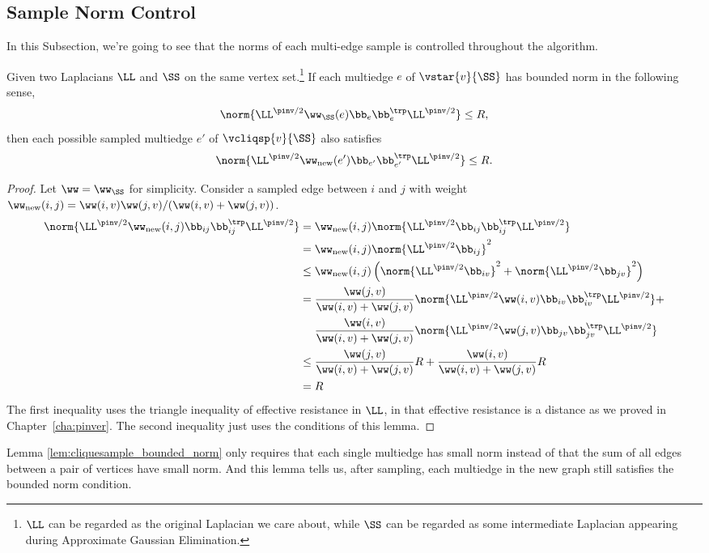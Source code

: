 \subsection{Sample Norm Control}
In this Subsection, we're going to see that the norms of each
multi-edge sample is controlled throughout the algorithm.
\begin{lemma}\label{lem:cliquesample_bounded_norm}
  Given two Laplacians $\LL$ and $\SS$ on the same vertex
  set.\footnote{$\LL$ can be regarded as the original Laplacian we
    care about, while $\SS$ can be regarded as some intermediate
    Laplacian appearing during Approximate Gaussian Elimination.} If
  each multiedge $e$ of $\vstar{v}{\SS}$ has bounded norm in the following sense,
  \[ \norm{\LL^{\pinv/2}\ww_{\SS}(e)\bb_e\bb_e^{\trp}\LL^{\pinv/2}} \leq R, \]
  then each possible sampled multiedge $e'$ of $\vcliqsp{v}{\SS}$ also satisfies
  \[ \norm{\LL^{\pinv/2}\ww_{\mathrm{new}}(e')\bb_{e'}\bb_{e'}^{\trp}\LL^{\pinv/2}} \leq R. \]
\end{lemma}
\begin{proof}
  Let $\ww=\ww_{\SS}$ for simplicity. Consider a sampled edge between $i$ and $j$ with weight $\ww_{\mathrm{new}}(i,j) = \ww(i,v)\ww(j,v)/(\ww(i,v)+\ww(j,v))$.
  \begin{align*}
    \norm{\LL^{\pinv/2} \ww_{\mathrm{new}}(i,j) \bb_{ij}\bb_{ij}^{\trp}\LL^{\pinv/2}}
    &= \ww_{\mathrm{new}}(i,j) \norm{\LL^{\pinv/2} \bb_{ij}\bb_{ij}^{\trp}\LL^{\pinv/2}} \\
    &= \ww_{\mathrm{new}}(i,j) \norm{ \LL^{\pinv/2}\bb_{ij} }^2 \\
    &\leq \ww_{\mathrm{new}}(i,j) \left( \norm{\LL^{\pinv/2}\bb_{iv}}^2 + \norm{\LL^{\pinv/2}\bb_{jv}}^2 \right) \\
    &= \frac{\ww(j,v)}{\ww(i,v)+\ww(j,v)} \norm{\LL^{\pinv/2} \ww(i,v)\bb_{iv}\bb_{iv}^{\trp}\LL^{\pinv/2}} + \\
    & ~\quad \frac{\ww(i,v)}{\ww(i,v)+\ww(j,v)} \norm{\LL^{\pinv/2} \ww(j,v)\bb_{jv}\bb_{jv}^{\trp}\LL^{\pinv/2}} \\
    &\leq \frac{\ww(j,v)}{\ww(i,v)+\ww(j,v)} R + \frac{\ww(i,v)}{\ww(i,v)+\ww(j,v)} R \\
    &= R
  \end{align*}
  The first inequality uses the triangle inequality of effective
  resistance in $\LL$, in that effective resistance is a distance as
  we proved in Chapter~\ref{cha:pinver}. The second inequality just uses the conditions of this lemma.
\end{proof}
\begin{remark}
  Lemma \ref{lem:cliquesample_bounded_norm} only requires that each single multiedge has small norm instead of that the sum of all edges between a pair of vertices have small norm. And this lemma tells us, after sampling, each multiedge in the new graph still satisfies the bounded norm condition.
\end{remark}

